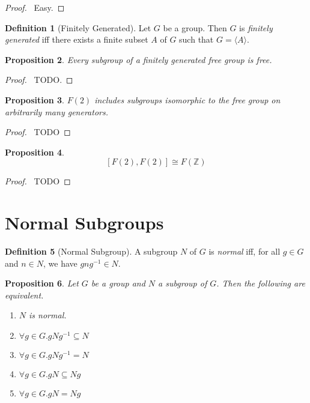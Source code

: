 \documentclass{book}
\let\qed\relax
\newtheorem{prop}{Proposition}[chapter]
\theoremstyle{definition}
\newtheorem{df}[prop]{Definition}
\newcommand{\inv}[1]{\ensuremath{{#1}^{-1}}}
\begin{document}
\begin{proof}
\pf\ Easy. \qed
\end{proof}

\begin{df}[Finitely Generated]
Let $G$ be a group. Then $G$ is \emph{finitely generated} iff there exists a finite subset $A$ of $G$ such that $G = \langle A \rangle$.
\end{df}

\begin{prop}
Every subgroup of a finitely generated free group is free.
\end{prop}

\begin{proof}
\pf\ TODO.
\end{proof}

\begin{prop}
$F(2)$ includes subgroups isomorphic to the free group on arbitrarily many generators.
\end{prop}

\begin{proof}
\pf\ TODO
\end{proof}

\begin{prop}
\[ [F(2),F(2)] \cong F(\mathbb{Z}) \]
\end{prop}

\begin{proof}
\pf\ TODO
\end{proof}

\section{Normal Subgroups}

\begin{df}[Normal Subgroup]
A subgroup $N$ of $G$ is \emph{normal} iff, for all $g \in G$ and $n \in N$, we have $gn\inv{g} \in N$.
\end{df}

\begin{prop}
Let $G$ be a group and $N$ a subgroup of $G$. Then the following are equivalent.
\begin{enumerate}
\item $N$ is normal.
\item $\forall g \in G. g N \inv{g} \subseteq N$
\item $\forall g \in G. g N \inv{g} = N$
\item $\forall g \in G. g N \subseteq N g$
\item $\forall g \in G. gN = Ng$
\end{enumerate}
\end{prop}
\end{document}
